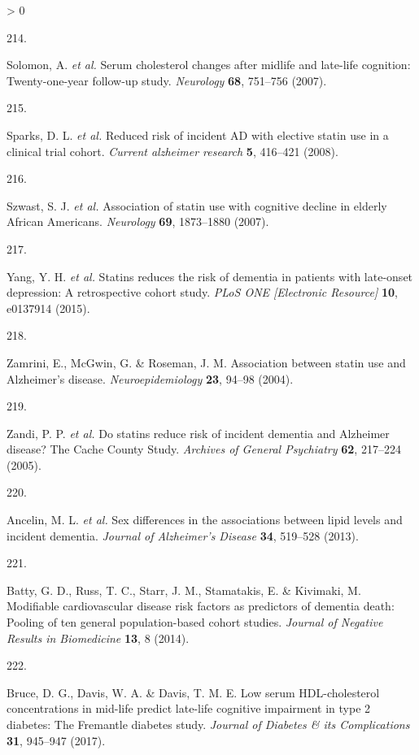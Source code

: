 \documentclass[a4paper, twoside]{templates/ociamthesis}
\newlength{\cslhangindent}
\newlength{\csllabelwidth}
\newenvironment{CSLReferences}[3] %
 {%
  \setlength{\parindent}{0pt}
  \ifodd #1 \everypar{\setlength{\hangindent}{\cslhangindent}}\ignorespaces\fi
  \ifnum #2 > 0
  \setlength{\parskip}{#2\baselineskip}
  \fi
 }%
 {}
\newcommand{\CSLLeftMargin}[1]{\parbox[t]{\maxof{\widthof{#1}}{\csllabelwidth}}{#1}}
\newcommand{\CSLRightInline}[1]{\parbox[t]{\linewidth - \csllabelwidth}{#1}}
\begin{document}
\begin{CSLReferences}{0}{0}
\leavevmode\hypertarget{ref-solomon2007}{}%
\CSLLeftMargin{214. }
\CSLRightInline{Solomon, A. \emph{et al.} Serum cholesterol changes after midlife and late-life cognition: Twenty-one-year follow-up study. \emph{Neurology} \textbf{68}, 751--756 (2007).}

\leavevmode\hypertarget{ref-sparks2008}{}%
\CSLLeftMargin{215. }
\CSLRightInline{Sparks, D. L. \emph{et al.} Reduced risk of incident {AD} with elective statin use in a clinical trial cohort. \emph{Current alzheimer research} \textbf{5}, 416--421 (2008).}

\leavevmode\hypertarget{ref-szwast2007}{}%
\CSLLeftMargin{216. }
\CSLRightInline{Szwast, S. J. \emph{et al.} Association of statin use with cognitive decline in elderly {African Americans}. \emph{Neurology} \textbf{69}, 1873--1880 (2007).}

\leavevmode\hypertarget{ref-yang2015}{}%
\CSLLeftMargin{217. }
\CSLRightInline{Yang, Y. H. \emph{et al.} Statins reduces the risk of dementia in patients with late-onset depression: A retrospective cohort study. \emph{PLoS ONE {[}Electronic Resource{]}} \textbf{10}, e0137914 (2015).}

\leavevmode\hypertarget{ref-zamrini2004}{}%
\CSLLeftMargin{218. }
\CSLRightInline{Zamrini, E., McGwin, G. \& Roseman, J. M. Association between statin use and {Alzheimer}'s disease. \emph{Neuroepidemiology} \textbf{23}, 94--98 (2004).}

\leavevmode\hypertarget{ref-zandi2005}{}%
\CSLLeftMargin{219. }
\CSLRightInline{Zandi, P. P. \emph{et al.} Do statins reduce risk of incident dementia and {Alzheimer} disease? The {Cache County Study}. \emph{Archives of General Psychiatry} \textbf{62}, 217--224 (2005).}

\leavevmode\hypertarget{ref-ancelin2013}{}%
\CSLLeftMargin{220. }
\CSLRightInline{Ancelin, M. L. \emph{et al.} Sex differences in the associations between lipid levels and incident dementia. \emph{Journal of Alzheimer's Disease} \textbf{34}, 519--528 (2013).}

\leavevmode\hypertarget{ref-batty2014}{}%
\CSLLeftMargin{221. }
\CSLRightInline{Batty, G. D., Russ, T. C., Starr, J. M., Stamatakis, E. \& Kivimaki, M. Modifiable cardiovascular disease risk factors as predictors of dementia death: Pooling of ten general population-based cohort studies. \emph{Journal of Negative Results in Biomedicine} \textbf{13}, 8 (2014).}

\leavevmode\hypertarget{ref-bruce2017}{}%
\CSLLeftMargin{222. }
\CSLRightInline{Bruce, D. G., Davis, W. A. \& Davis, T. M. E. Low serum {HDL}-cholesterol concentrations in mid-life predict late-life cognitive impairment in type 2 diabetes: The {Fremantle} diabetes study. \emph{Journal of Diabetes \& its Complications} \textbf{31}, 945--947 (2017).}


\end{CSLReferences}
\end{document}
